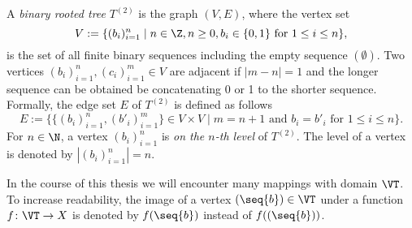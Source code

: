
\begin{defin}
A \emph{binary rooted tree} $T^{(2)}$ is the graph $(V,E)$, where the vertex set 
\begin{equation*}
V:=\lbrace (b_i)_{i=1}^n\mid n\in \Z, n\geq 0, b_i\in\lbrace 0,1\rbrace\text{ for }1\leq i\leq n\rbrace,
\end{equation*}
is the set of all finite binary sequences including the empty sequence $(\emptyset)$. Two vertices $(b_i)_{i=1}^n,(c_i)_{i=1}^m\in V$ are adjacent if $|m-n|=1$ and the longer sequence can be obtained be concatenating 0 or 1 to the shorter sequence. Formally, the edge set $E$ of $T^{(2)}$ is defined as follows
\begin{equation*}
E:=\lbrace \lbrace(b_i)_{i=1}^n,(b'_i)_{i=1}^m\rbrace\in V\times V\mid m=n+1\text{ and } b_i=b'_i\text{ for } 1\leq i\leq n\rbrace.
\end{equation*}
For $n\in\N$, a vertex $(b_i)_{i=1}^n$ is \emph{on the $n$-th level} of $T^{(2)}$. The level of a vertex  is denoted by $|(b_i)_{i=1}^n|=n.$
\end{defin}
In the course of this thesis we will encounter many mappings with domain $\VT$. To increase readability, the image of a vertex $(\seq{b})\in\VT$ under a function $f\colon \VT\to X$ is denoted by $f(\seq{b})$ instead of $f((\seq{b}))$.


